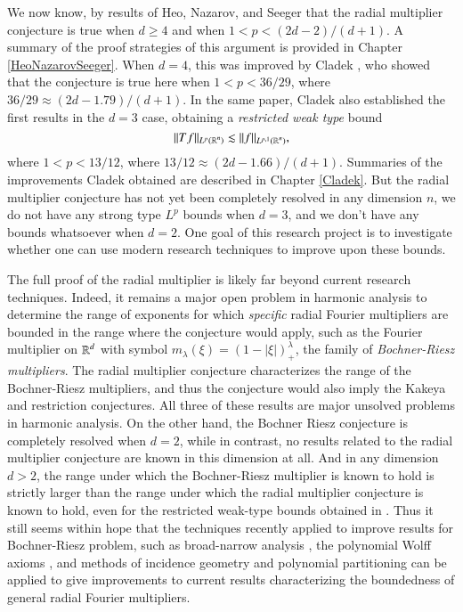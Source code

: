 We now know, by results of Heo, Nazarov, and Seeger \cite{HeoandNazarovandSeeger} that the radial multiplier conjecture is true when $d \geq 4$ and when $1 < p < (2d-2)/(d+1)$. A summary of the proof strategies of this argument is provided in Chapter \ref{HeoNazarovSeeger}. When $d = 4$, this was improved by Cladek \cite{Cladek}, who showed that the conjecture is true here when $1 < p < 36/29$, where $36/29 \approx (2d - 1.79)/(d+1)$. In the same paper, Cladek also established the first results in the $d = 3$ case, obtaining a \emph{restricted weak type} bound
% 
\[ \| Tf \|_{L^p(\operatorname{\mathbb{R}}^n)} \lesssim \| f \|_{L^{p,1}(\operatorname{\mathbb{R}}^n)}, \]
where $1 < p < 13/12$, where $13/12 \approx (2d - 1.66)/(d+1)$. Summaries of the improvements Cladek obtained are described in Chapter \ref{Cladek}. But the radial multiplier conjecture has not yet been completely resolved in any dimension $n$, we do not have any strong type $L^p$ bounds when $d = 3$, and we don't have any bounds whatsoever when $d = 2$. One goal of this research project is to investigate whether one can use modern research techniques to improve upon these bounds.

The full proof of the radial multiplier is likely far beyond current research techniques. Indeed, it remains a major open problem in harmonic analysis to determine the range of exponents for which \emph{specific} radial Fourier multipliers are bounded in the range where the conjecture would apply, such as the Fourier multiplier on $\operatorname{\mathbb{R}}^d$ with symbol $m_\lambda(\xi) = \left( 1 - |\xi| \right)^\lambda_+$, the family of \emph{Bochner-Riesz multipliers}. The radial multiplier conjecture characterizes the range of the Bochner-Riesz multipliers, and thus the conjecture would also imply the Kakeya and restriction conjectures. All three of these results are major unsolved problems in harmonic analysis. On the other hand, the Bochner Riesz conjecture is completely resolved when $d = 2$, while in contrast, no results related to the radial multiplier conjecture are known in this dimension at all. And in any dimension $d > 2$, the range under which the Bochner-Riesz multiplier is known to hold \cite{GuoandOhandWangandWuandZhang} is strictly larger than the range under which the radial multiplier conjecture is known to hold, even for the restricted weak-type bounds obtained in \cite{Cladek}. Thus it still seems within hope that the techniques recently applied to improve results for Bochner-Riesz problem, such as broad-narrow analysis \cite{BourgainandGuth}, the polynomial Wolff axioms \cite{KatzandRogers}, and methods of incidence geometry and polynomial partitioning \cite{Zahl2} can be applied to give improvements to current results characterizing the boundedness of general radial Fourier multipliers.

